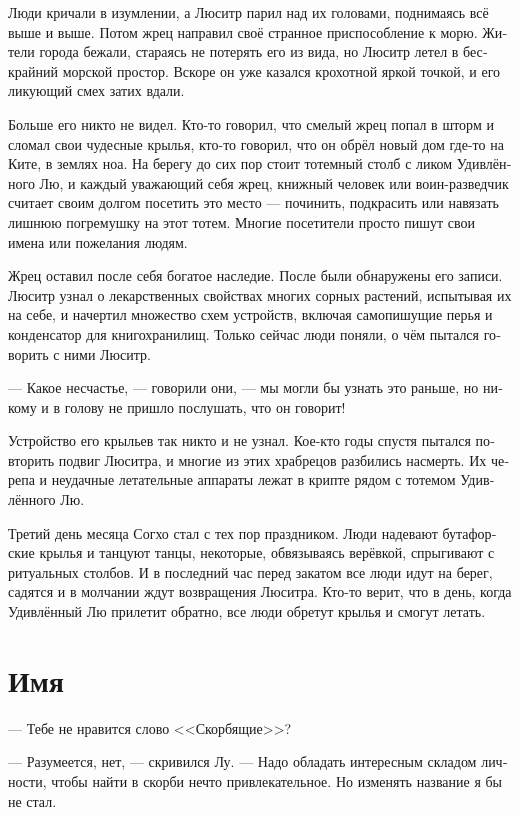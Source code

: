 \documentclass[a4paper,12pt,fleqn]{book}\usepackage{cooltooltips}\usepackage{polyglossia}\setdefaultlanguage[babelshorthands=true]{russian}\setotherlanguage{english}\defaultfontfeatures{Ligatures=TeX,Mapping=tex-text} \usepackage{xcolor}\definecolor{lightgray}{HTML}{bbbbbb}\color{lightgray}\newcommand{\ml}[3]{\textenglish{\textcolor{black}{#3}}}
\begin{document}
{Люди кричали в изумлении, а Люситр парил над их головами, поднимаясь всё выше и выше.
Потом жрец направил своё странное приспособление к морю.
Жители города бежали, стараясь не потерять его из вида, но Люситр летел в бескрайний морской простор.
Вскоре он уже казался крохотной яркой точкой, и его ликующий смех затих вдали.

Больше его никто не видел.
Кто-то говорил, что смелый жрец попал в шторм и сломал свои чудесные крылья, кто-то говорил, что он обрёл новый дом где-то на Ките, в землях ноа.
На берегу до сих пор стоит тотемный столб с ликом Удивлённого Лю, и каждый уважающий себя жрец, книжный человек или воин-разведчик считает своим долгом посетить это место --- починить, подкрасить или навязать лишнюю погремушку на этот тотем.
Многие посетители просто пишут свои имена или пожелания людям.

Жрец оставил после себя богатое наследие.
После были обнаружены его записи.
Люситр узнал о лекарственных свойствах многих сорных растений, испытывая их на себе, и начертил множество схем устройств, включая самопишущие перья и конденсатор для книгохранилищ.
Только сейчас люди поняли, о чём пытался говорить с ними Люситр.

--- Какое несчастье, --- говорили они, --- мы могли бы узнать это раньше, но никому и в голову не пришло послушать, что он говорит!

Устройство его крыльев так никто и не узнал.
Кое-кто годы спустя пытался повторить подвиг Люситра, и многие из этих храбрецов разбились насмерть.
Их черепа и неудачные летательные аппараты лежат в крипте рядом с тотемом Удивлённого Лю.

Третий день месяца Согхо стал с тех пор праздником.
Люди надевают бутафорские крылья и танцуют танцы, некоторые, обвязываясь верёвкой, спрыгивают с ритуальных столбов.
И в последний час перед закатом все люди идут на берег, садятся и в молчании ждут возвращения Люситра.
Кто-то верит, что в день, когда Удивлённый Лю прилетит обратно, все люди обретут крылья и смогут летать.

\section{Имя}

--- Тебе не нравится слово <<Скорбящие>>?

--- Разумеется, нет, --- скривился Лу.
--- Надо обладать интересным складом личности, чтобы найти в скорби нечто привлекательное.
Но изменять название я бы не стал.

}
\end{document}
